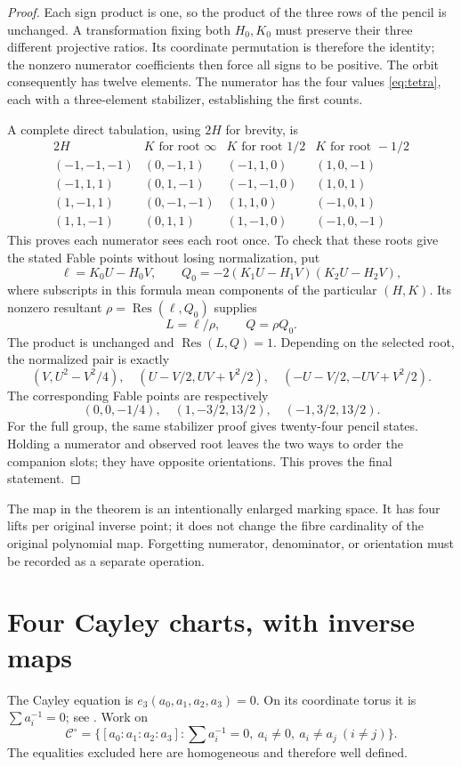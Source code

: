 \documentclass[11pt]{article}
\theoremstyle{remark}\newtheorem{remark}[theorem]{Remark}
\newcommand{\Res}{\operatorname{Res}}
\begin{document}
\begin{proof}
Each sign product is one, so the product of the three rows of the pencil is unchanged. A transformation fixing both $H_0,K_0$ must preserve their three different projective ratios. Its coordinate permutation is therefore the identity; the nonzero numerator coefficients then force all signs to be positive. The orbit consequently has twelve elements. The numerator has the four values \eqref{eq:tetra}, each with a three-element stabilizer, establishing the first counts.

A complete direct tabulation, using $2H$ for brevity, is
\[
\begin{array}{c|ccc}
2H&K\text{ for root }\infty&K\text{ for root }1/2&K\text{ for root }-1/2\\\hline
(-1,-1,-1)&(0,-1,1)&(-1,1,0)&(1,0,-1)\\
(-1,1,1)&(0,1,-1)&(-1,-1,0)&(1,0,1)\\
(1,-1,1)&(0,-1,-1)&(1,1,0)&(-1,0,1)\\
(1,1,-1)&(0,1,1)&(1,-1,0)&(-1,0,-1)
\end{array}
\]
This proves each numerator sees each root once. To check that these roots give the stated Fable points without losing normalization, put
\[
 \ell=K_0U-H_0V,\qquad Q_0=-2(K_1U-H_1V)(K_2U-H_2V),
\]
where subscripts in this formula mean components of the particular $(H,K)$. Its nonzero resultant $\rho=\Res(\ell,Q_0)$ supplies
\[
 L=\ell/\rho,\qquad Q=\rho Q_0.
\]
The product is unchanged and $\Res(L,Q)=1$. Depending on the selected root, the normalized pair is exactly
\[
 (V,U^2-V^2/4),\quad
 (U-V/2,UV+V^2/2),\quad
 (-U-V/2,-UV+V^2/2).
\]
The corresponding Fable points are respectively
\[
 (0,0,-1/4),\quad(1,-3/2,13/2),\quad(-1,3/2,13/2).
\]
For the full group, the same stabilizer proof gives twenty-four pencil states. Holding a numerator and observed root leaves the two ways to order the companion slots; they have opposite orientations. This proves the final statement.
\end{proof}

The map in the theorem is an intentionally enlarged marking space. It has four lifts per original inverse point; it does not change the fibre cardinality of the original polynomial map. Forgetting numerator, denominator, or orientation must be recorded as a separate operation.

\section{Four Cayley charts, with inverse maps}
The Cayley equation is $e_3(a_0,a_1,a_2,a_3)=0$. On its coordinate torus it is
$\sum a_i^{-1}=0$; see \citet[\S1]{heathbrown}. Work on
\[
 \mathcal C^\circ=\{[a_0:a_1:a_2:a_3]:
 \sum a_i^{-1}=0,\ a_i\ne0,\ a_i\ne a_j\ (i\ne j)\}.
\]
The equalities excluded here are homogeneous and therefore well defined.
\end{document}
